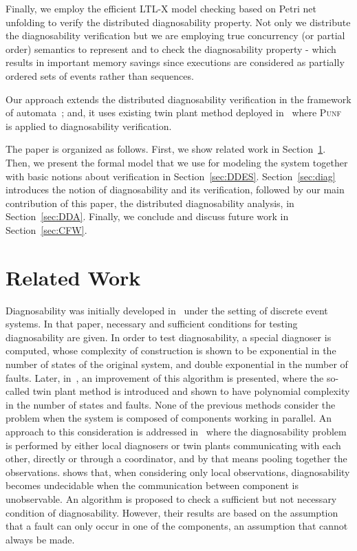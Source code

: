 \documentclass[a4paper]{article}
\newcommand{\punf}           {\textsc{Punf}\xspace}
\begin{document}
Finally, we employ the efficient LTL-X model checking based on Petri net unfolding to verify the distributed diagnosability property. Not only we distribute the diagnosability verification but we are employing true concurrency (or partial order) semantics to represent and to check the diagnosability property - which results in important memory savings since executions are considered as partially ordered sets of events rather than sequences.

Our approach extends the distributed diagnosability verification in the framework of automata~\cite{par_diag}; and, it uses existing twin plant method de\-plo\-yed in~\cite{Madalinski2010} where \punf~\cite{punf} is applied to diagnosability verification. 

The paper is organized as follows. First, we show related work in Section~\ref{sec:RelatedWork}. Then, we present the formal model that we use for modeling the system together with basic notions about verification in Section~\ref{sec:DDES}. Section~\ref{sec:diag} introduces the notion of diagnosability and its verification, followed by our main contribution of this paper, the distributed diagnosability analysis, in Section~\ref{sec:DDA}. Finally, we conclude and discuss future work in Section~\ref{sec:CFW}.

\section{Related Work} \label{sec:RelatedWork}

Diagnosability was initially developed in~\cite{Sampath1995} under the setting of discrete event systems. In that paper, necessary and sufficient conditions for testing diagnosability are given. In order to test diagnosability, a special diagnoser is computed, whose complexity of construction is shown to be exponential in the number of states of the original system, and double exponential in the number of faults. Later, in~\cite{twin}, an improvement of this algorithm is presented, where the so-called twin plant method is introduced and shown to have polynomial complexity in the number of states and faults. 
None of the previous methods consider the problem when the system is composed of components working in parallel. An approach to this consideration is addressed in~\cite{Schumann07scalablediagnosability,Debouk_acoordinated,distributeddiag,SchumannH08} where the diagnosability problem is performed by either local diagnosers or twin plants communicating with each other, directly or through a coordinator, and by that means pooling together the observations. \cite{YeDagueValid} shows that, when considering only local observations, diagnosability becomes undecidable when the communication between component is unobservable. An algorithm is proposed to check a sufficient but not necessary condition of diagnosability. However, their results are based on the assumption that a fault can only occur in one of the components, an assumption that cannot always be made.
\end{document}

